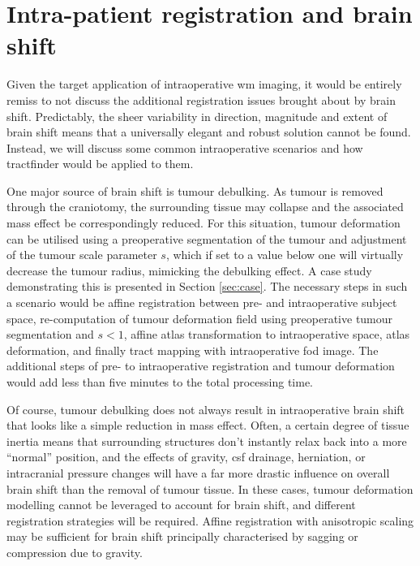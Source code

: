 \section{Intra-patient registration and brain shift}

Given the target application of intraoperative \gls{wm} imaging, it would be entirely remiss to not discuss the additional registration issues brought about by brain shift.
Predictably, the sheer variability in direction, magnitude and extent of brain shift means that a universally elegant and robust solution cannot be found.
Instead, we will discuss some common intraoperative scenarios and how tractfinder would be applied to them.

One major source of brain shift is tumour debulking.
As tumour is removed through the craniotomy, the surrounding tissue may collapse and the associated mass effect be correspondingly reduced.
For this situation, tumour deformation can be utilised using a preoperative segmentation of the tumour and adjustment of the tumour scale parameter $s$, which if set to a value below one will virtually decrease the tumour radius, mimicking the debulking effect.
A case study demonstrating this is presented in Section \ref{sec:case}.
The necessary steps in such a scenario would be affine registration between pre- and intraoperative subject space, re-computation of tumour deformation field using preoperative tumour segmentation and $s<1$, affine atlas transformation to intraoperative space, atlas deformation, and finally tract mapping with intraoperative \gls{fod} image.
The additional steps of pre- to intraoperative registration and tumour deformation would add less than five minutes to the total processing time.

Of course, tumour debulking does not always result in intraoperative brain shift that looks like a simple reduction in mass effect.
Often, a certain degree of tissue inertia means that surrounding structures don't instantly relax back into a more ``normal'' position, and the effects of gravity, \gls{csf} drainage, herniation, or intracranial pressure changes will have a far more drastic influence on overall brain shift than the removal of tumour tissue.
In these cases, tumour deformation modelling cannot be leveraged to account for brain shift, and different registration strategies will be required.
Affine registration with anisotropic scaling may be sufficient for brain shift principally characterised by sagging or compression due to gravity.

